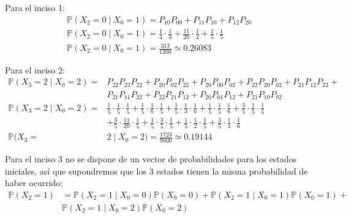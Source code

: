\documentclass{article}
\begin{document}
            Para el inciso 1:
            \begin{gather*}
                \mathbb{P}(X_2 = 0 \mid X_0 = 1) = P_{10} P_{00} + P_{11} P_{10} + P_{12} P_{20} \\
                \mathbb{P}(X_2 = 0 \mid X_0 = 1) = \frac{1}{4} \cdot \frac{1}{3} + \frac{11}{20} \cdot \frac{1}{4} + \frac{1}{5} \cdot \frac{1}{5} \\
                \mathbb{P}(X_2 = 0 \mid X_0 = 1) = \frac{313}{1200} \simeq 0.26083
            \end{gather*}
            
            Para el inciso 2:
            \begin{equation*}
                \begin{split}
                    \mathbb{P}(X_3 = 2 \mid X_0 = 2) = & P_{22} P_{22} P_{22} + P_{20} P_{02} P_{22} + P_{20} P_{00} P_{02} + P_{22} P_{20} P_{02} + P_{21}P_{12}P_{22} + \\ & P_{21} P_{11} P_{22} + P_{22}P_{21}P_{12} + P_{20}P_{01}P_{12} + P_{21}P_{10}P_{02} \\
                    \mathbb{P}(X_3 = 2 \mid X_0 = 2) = & \frac{1}{5} \cdot \frac{1}{5} \cdot \frac{1}{5} + \frac{1}{5} \cdot \frac{1}{6} \cdot \frac{1}{5} + \frac{1}{5} \cdot \frac{1}{3} \cdot \frac{1}{6} + \frac{1}{5} \cdot \frac{1}{5} \cdot \frac{1}{6} + \frac{3}{5} \cdot \frac{1}{5} \cdot \frac{1}{5} \\ & + \frac{3}{5} \cdot \frac{11}{20} \cdot \frac{1}{5} + \frac{1}{5} \cdot \frac{3}{5} \cdot \frac{1}{5} + \frac{1}{5} \cdot \frac{1}{2} \cdot \frac{1}{5} + \frac{3}{5} \cdot \frac{1}{4} \cdot \frac{1}{6} \\
                    \mathbb{P}(X_3 = & 2 \mid X_0 = 2) = \frac{1723}{9000} \simeq 0.19144
                \end{split}
            \end{equation*}

            Para el inciso 3 no se dispone de un vector de probabilidades para los estados iniciales, así que supondremos que los 3 estados tienen la misma probabilidad de haber ocurrido:
            \begin{equation*}
                \begin{split}
                    \mathbb{P}(X_2 = 1) &= \mathbb{P}(X_2 = 1 \mid X_0 = 0) \mathbb{P}(X_0 = 0) + \mathbb{P}(X_2 = 1 \mid X_0 = 1) \mathbb{P}(X_0 = 1) + \\ & \mathbb{P}(X_2 = 1 \mid X_0 = 2) \mathbb{P}(X_0 = 2)
                \end{split}
            \end{equation*}
\end{document}

